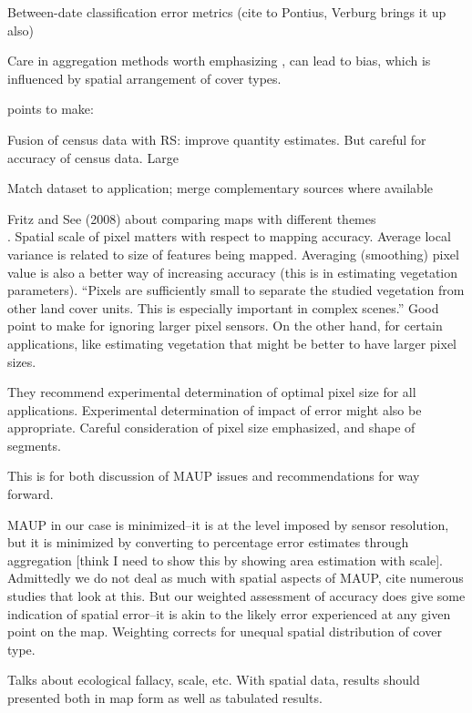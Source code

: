 \documentclass[a4paper]{article}
\begin{document}
Between-date classification error metrics (cite to Pontius, Verburg brings it up also) 

Care in aggregation methods worth emphasizing \citep{verburg_challenges_2011,dendoncker_exploring_2008,raj_analysing_2013,moody_influence_1995}, can lead to bias, which is influenced by spatial arrangement of cover types. 

points to make: 

Fusion of census data with RS: improve quantity estimates. But careful for accuracy of census data. Large

Match dataset to application; merge complementary sources where available \citep{verburg_challenges_2011}

Fritz and See (2008) about comparing maps with different themes\\

\citep{nijland_optimizing_2009}. Spatial scale of pixel matters with respect to mapping accuracy.  Average local variance is related to size of features being mapped. Averaging (smoothing) pixel value is also a better way of increasing accuracy (this is in estimating vegetation parameters).  ``Pixels are sufficiently small to separate the studied vegetation from other land cover units. This is especially important in complex scenes.''  Good point to make for ignoring larger pixel sensors.  On the other hand, for certain applications, like estimating vegetation that might be better to have larger pixel sizes.  

They recommend experimental determination of optimal pixel size for all applications. Experimental determination of impact of error might also be appropriate.  Careful consideration of pixel size emphasized, and shape of segments.  

This is for both discussion of MAUP issues and recommendations for way forward. 

MAUP in our case is minimized--it is at the level imposed by sensor resolution, but it is minimized by converting to percentage error estimates through aggregation [think I need to show this by showing area estimation with scale].  Admittedly we do not deal as much with spatial aspects of MAUP, cite numerous studies that look at this. But our weighted assessment of accuracy does give some indication of spatial error--it is akin to the likely error experienced at any given point on the map.  Weighting corrects for unequal spatial distribution of cover type.  

\citep{nelson_analysing_2001} Talks about ecological fallacy, scale, etc.  With spatial data, results should presented both in map form as well as tabulated results. 
\end{document}
